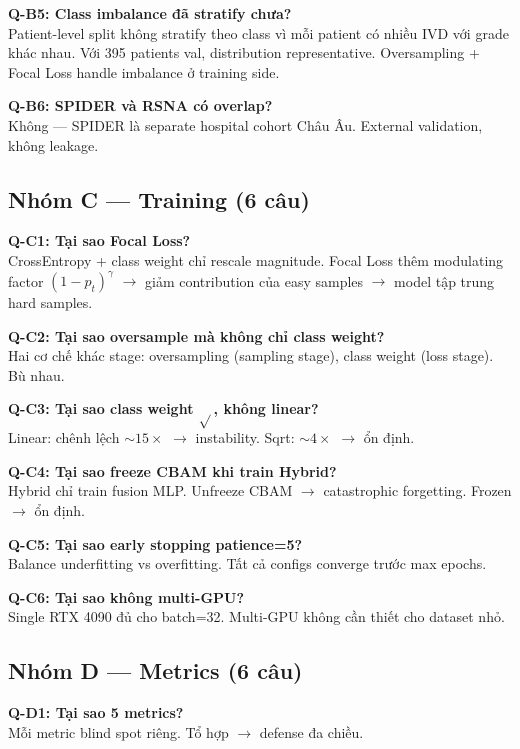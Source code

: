 \documentclass[11pt,a4paper]{article}
\begin{document}
\textbf{Q-B5: Class imbalance đã stratify chưa?}\\
Patient-level split không stratify theo class vì mỗi patient có nhiều
IVD với grade khác nhau. Với 395 patients val, distribution
representative. Oversampling + Focal Loss handle imbalance ở training side.

\textbf{Q-B6: SPIDER và RSNA có overlap?}\\
Không --- SPIDER là separate hospital cohort Châu Âu. External
validation, không leakage.

\subsection*{Nhóm C — Training (6 câu)}

\textbf{Q-C1: Tại sao Focal Loss?}\\
CrossEntropy + class weight chỉ rescale magnitude. Focal Loss thêm
modulating factor $(1-p_t)^{\gamma}$ $\to$ giảm contribution của easy
samples $\to$ model tập trung hard samples.

\textbf{Q-C2: Tại sao oversample mà không chỉ class weight?}\\
Hai cơ chế khác stage: oversampling (sampling stage), class weight
(loss stage). Bù nhau.

\textbf{Q-C3: Tại sao class weight $\sqrt{}$, không linear?}\\
Linear: chênh lệch $\sim 15\times$ $\to$ instability. Sqrt: $\sim
4\times$ $\to$ ổn định.

\textbf{Q-C4: Tại sao freeze CBAM khi train Hybrid?}\\
Hybrid chỉ train fusion MLP. Unfreeze CBAM $\to$ catastrophic
forgetting. Frozen $\to$ ổn định.

\textbf{Q-C5: Tại sao early stopping patience=5?}\\
Balance underfitting vs overfitting. Tất cả configs converge trước max
epochs.

\textbf{Q-C6: Tại sao không multi-GPU?}\\
Single RTX 4090 đủ cho batch=32. Multi-GPU không cần thiết cho dataset
nhỏ.

\subsection*{Nhóm D — Metrics (6 câu)}

\textbf{Q-D1: Tại sao 5 metrics?}\\
Mỗi metric blind spot riêng. Tổ hợp $\to$ defense đa chiều.
\end{document}
